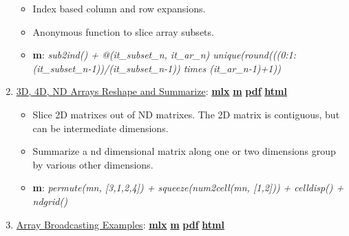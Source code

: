 \documentclass[
]{book}
\providecommand{\tightlist}{%
  \setlength{\itemsep}{0pt}\setlength{\parskip}{0pt}}
\begin{document}
\begin{enumerate}
  \begin{itemize}
  \tightlist
  \item
    Index based column and row expansions.
  \item
    Anonymous function to slice array subsets.
  \item
    \textbf{m}: \emph{sub2ind() + @(it\_subset\_n, it\_ar\_n) unique(round(((0:1:(it\_subset\_n-1))/(it\_subset\_n-1)) times (it\_ar\_n-1)+1))}
  \end{itemize}
\item
  \href{https://fanwangecon.github.io/M4Econ/amto/array/htmlpdfm/fs_3d4dndarray.html}{3D, 4D, ND Arrays Reshape and Summarize}: \href{https://github.com/FanWangEcon/M4Econ/blob/master/amto/array/fs_3d4dndarray.mlx}{\textbf{mlx}} \textbar{} \href{https://github.com/FanWangEcon/M4Econ/blob/master/amto/array/htmlpdfm/fs_3d4dndarray.m}{\textbf{m}} \textbar{} \href{https://github.com/FanWangEcon/M4Econ/blob/master/amto/array/htmlpdfm/fs_3d4dndarray.pdf}{\textbf{pdf}} \textbar{} \href{https://fanwangecon.github.io/M4Econ/amto/array/htmlpdfm/fs_3d4dndarray.html}{\textbf{html}}

  \begin{itemize}
  \tightlist
  \item
    Slice 2D matrixes out of ND matrixes. The 2D matrix is contiguous, but can be intermediate dimensions.
  \item
    Summarize a nd dimensional matrix along one or two dimensions group by various other dimensions.
  \item
    \textbf{m}: \emph{permute(mn, {[}3,1,2,4{]}) + squeeze(num2cell(mn, {[}1,2{]})) + celldisp() + ndgrid()}
  \end{itemize}
\item
  \href{https://fanwangecon.github.io/M4Econ/amto/array/htmlpdfm/fs_broadcast_expand.html}{Array Broadcasting Examples}: \href{https://github.com/FanWangEcon/M4Econ/blob/master/amto/array/fs_broadcast_expand.mlx}{\textbf{mlx}} \textbar{} \href{https://github.com/FanWangEcon/M4Econ/blob/master/amto/array/htmlpdfm/fs_broadcast_expand.m}{\textbf{m}} \textbar{} \href{https://github.com/FanWangEcon/M4Econ/blob/master/amto/array/htmlpdfm/fs_broadcast_expand.pdf}{\textbf{pdf}} \textbar{} \href{https://fanwangecon.github.io/M4Econ/amto/array/htmlpdfm/fs_broadcast_expand.html}{\textbf{html}}


\end{enumerate}
\end{document}
